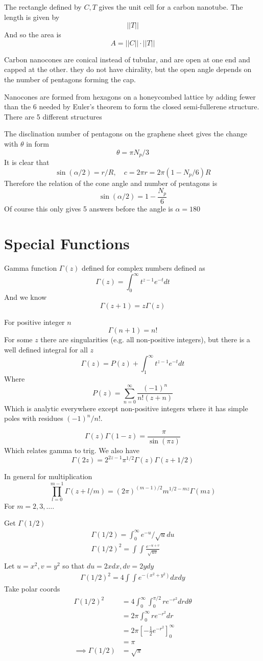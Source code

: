 \documentclass{E:/Documents/Latex/myassignment}
\begin{document}
The rectangle defined by $C,T$ gives the unit cell for a carbon nanotube. The length is given by
\[||T||\]
And so the area is
\[A = ||C||\cdot ||T||\]


Carbon nanocones are conical instead of tubular, and are open at one end and capped at the other. they do not have chirality, but the open angle depends on the number of pentagons forming the cap.

Nanocones are formed from hexagons on a honeycombed lattice by adding fewer than the $6$ needed by Euler's theorem to form the closed semi-fullerene structure. 
There are 5 different structures

The disclination number of pentagons on the graphene sheet gives the change with $\theta$ in form
\[\theta = \pi N_p/3\]
It is clear that 
\[\sin(\alpha /2 ) = r/R, \quad c = 2\pi r = 2\pi(1 - N_p/6)R\]
Therefore the relation of the cone angle and number of pentagons is
\[\sin(\alpha/2) = 1 - \frac{N_p}{6}\]
Of course this only gives 5 answers before the angle is $\alpha = 180$


\section{Special Functions}
Gamma function $\Gamma(z)$ defined for complex numbers defined as
\[\Gamma(z) = \int_0^\infty t^{z-1} e^{-t} dt\]
And we know
\[\Gamma(z+1) = z\Gamma(z)\]

For positive integer $n$
\[\Gamma(n+1) = n!\]
For some $z$ there are singularities (e.g. all non-positive integers), but there is a well defined integral for all $z$
\[\Gamma(z) = P(z) + \int_1^\infty t^{z-1}e^{-t}dt\]
Where
\[P(z) = \sum_{n=0}^\infty \frac{(-1)^n}{n!(z+n)}\]
Which is analytic everywhere except non-positive integers where it has simple poles with residues $(-1)^n/n!$.

\[\Gamma(z) \Gamma(1-z) = \frac{\pi}{\sin(\pi z)}\]
Which relates gamma to trig.
We also have
\[\Gamma(2z) = 2^{2z-1} \pi^{1/2} \Gamma(z) \Gamma(z+1/2)\]

In general for multiplication
\[\prod_{l=0}^{m-1} \Gamma(z+l/m) = (2\pi)^{(m-1)/2} m^{1/2-mz} \Gamma(mz)\]
For $m=2,3,\ldots$. 

Get $\Gamma(1/2)$
\begin{align*}
	\Gamma(1/2) = \int_{0}^{\infty} e^{-u}/\sqrt{u} du\\
	\Gamma(1/2)^2 = \int\int \frac{e^{-u+v}}{\sqrt{uv}}\\
\end{align*}
Let $u=x^2, v=y^2$ so that $du = 2xdx, dv = 2ydy$
\begin{align*}
	\Gamma(1/2)^2 = 4\int\int e^{-(x^2+y^2)} dxdy
\end{align*}
Take polar coords
\begin{align*}
	\Gamma(1/2)^2 &= 4 \int_0^\infty \int_0^{\pi/2} re^{-r^2} dr d\theta\\
	&= 2\pi \int_0^\infty re^{-r^2} dr\\
	&= 2\pi\left[-\frac12 e^{-r^2}\right]_0^\infty\\
	&= \pi \\
	\implies \Gamma(1/2) &= \sqrt{\pi}
\end{align*}
\end{document}
